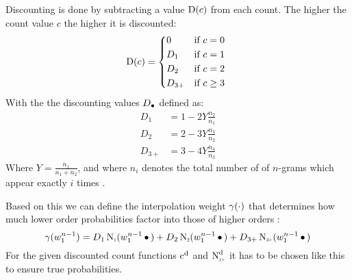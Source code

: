 Discounting is done by subtracting a value $\operatorname{D}(c)$ from each count.
The higher the count value $c$ the higher it is discounted:
\begin{equation}
  \Discount(c) =
    \begin{dcases*}
      0      & if $c = 0$ \\
      D_1    & if $c = 1$ \\
      D_2    & if $c = 2$ \\
      D_{3+} & if $c \geq 3$
    \end{dcases*}
\end{equation}
With the the discounting values $D_\bullet$ defined as:
\begin{subequations}
  \begin{align}
    D_1    &= 1 - 2 Y \frac{n_2}{n_1} \\
    D_2    &= 2 - 3 Y \frac{n_3}{n_2} \\
    D_{3+} &= 3 - 4 Y \frac{n_4}{n_3}
  \end{align}
\end{subequations}
Where $Y = \frac{n_1}{n_1 + n_2}$, and where $n_i$ denotes the total number of
of \mbox{$n$-grams} which appear exactly $i$ times \parencite{Pickhardt2014}.

Based on this we can define the interpolation weight $\gamma(\cdot)$ that
determines how much lower order probabilities factor into those of higher
orders \parencite{Pickhardt2014}:
\begin{equation}
  \gamma(w_1^{n-1}) =   D_1    \ContCountI    (w_1^{n-1} \WSkp)
                      + D_2    \ContCountII   (w_1^{n-1} \WSkp)
                      + D_{3+} \ContCountIIIp (w_1^{n-1} \WSkp)
\end{equation}
For the given discounted count functions $\DiscountedCount$ and
$\DiscountedCount*$ it has to be chosen like this to ensure true probabilities.

